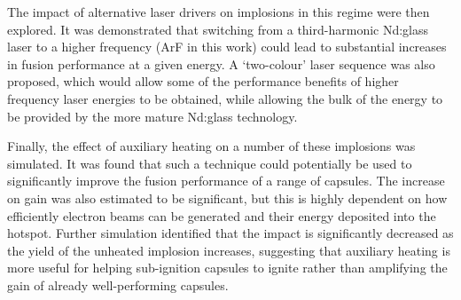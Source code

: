 The impact of alternative laser drivers on implosions in this regime were then explored. It was demonstrated that switching from a third-harmonic Nd:glass laser to a higher frequency (ArF in this work) could lead to substantial increases in fusion performance at a given energy. A `two-colour' laser sequence was also proposed, which would allow some of the performance benefits of higher frequency laser energies to be obtained, while allowing the bulk of the energy to be provided by the more mature Nd:glass technology.

Finally, the effect of auxiliary heating on a number of these implosions was simulated. It was found that such a technique could potentially be used to significantly improve the fusion performance of a range of capsules. The increase on gain was also estimated to be significant, but this is highly dependent on how efficiently electron beams can be generated and their energy deposited into the hotspot. Further simulation identified that the impact is significantly decreased as the yield of the unheated implosion increases, suggesting that auxiliary heating is more useful for helping sub-ignition capsules to ignite rather than amplifying the gain of already well-performing capsules. 






